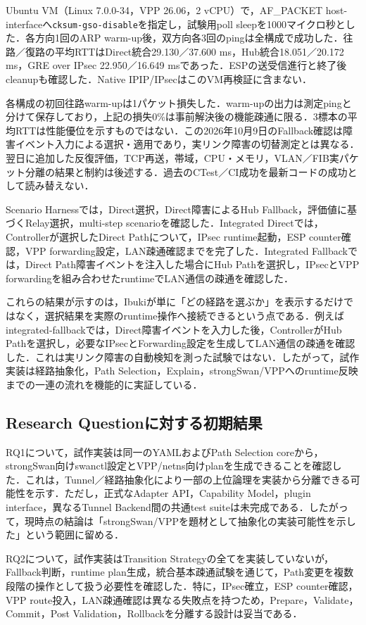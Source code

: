 \documentclass[11pt,a4paper,twoside]{ltjsarticle}
\begin{document}
Ubuntu VM（Linux 7.0.0-34，VPP 26.06，2 vCPU）で，AF\_PACKET host-interfaceへ\texttt{cksum-gso-disable}を指定し，試験用poll sleepを1000マイクロ秒とした．各方向1回のARP warm-up後，双方向各3回のpingは全構成で成功した．往路／復路の平均RTTはDirect統合29.130／37.600 ms，Hub統合18.051／20.172 ms，GRE over IPsec 22.950／16.649 msであった．ESPの送受信進行と終了後cleanupも確認した．Native IPIP/IPsecはこのVM再検証に含まない．

各構成の初回往路warm-upは1パケット損失した．warm-upの出力は測定pingと分けて保存しており，上記の損失0\%は事前解決後の機能疎通に限る．3標本の平均RTTは性能優位を示すものではない．この2026年10月9日のFallback確認は障害イベント入力による選択・適用であり，実リンク障害の切替測定とは異なる．翌日に追加した反復評価，TCP再送，帯域，CPU・メモリ，VLAN／FIB実パケット分離の結果と制約は後述する．過去のCTest／CI成功を最新コードの成功として読み替えない．

Scenario Harnessでは，Direct選択，Direct障害によるHub Fallback，評価値に基づくRelay選択，multi-step scenarioを確認した．Integrated Directでは，Controllerが選択したDirect Pathについて，IPsec runtime起動，ESP counter確認，VPP forwarding設定，LAN疎通確認までを完了した．Integrated Fallbackでは，Direct Path障害イベントを注入した場合にHub Pathを選択し，IPsecとVPP forwardingを組み合わせたruntimeでLAN通信の疎通を確認した．

これらの結果が示すのは，Ibukiが単に「どの経路を選ぶか」を表示するだけではなく，選択結果を実際のruntime操作へ接続できるという点である．例えばintegrated-fallbackでは，Direct障害イベントを入力した後，ControllerがHub Pathを選択し，必要なIPsecとForwarding設定を生成してLAN通信の疎通を確認した．これは実リンク障害の自動検知を測った試験ではない．したがって，試作実装は経路抽象化，Path Selection，Explain，strongSwan/VPPへのruntime反映までの一連の流れを機能的に実証している．

\subsection{Research Questionに対する初期結果}
RQ1について，試作実装は同一のYAMLおよびPath Selection coreから，strongSwan向けswanctl設定とVPP/netns向けplanを生成できることを確認した．これは，Tunnel／経路抽象化により一部の上位論理を実装から分離できる可能性を示す．ただし，正式なAdapter API，Capability Model，plugin interface，異なるTunnel Backend間の共通test suiteは未完成である．したがって，現時点の結論は「strongSwan/VPPを題材として抽象化の実装可能性を示した」という範囲に留める．

RQ2について，試作実装はTransition Strategyの全てを実装していないが，Fallback判断，runtime plan生成，統合基本疎通試験を通じて，Path変更を複数段階の操作として扱う必要性を確認した．特に，IPsec確立，ESP counter確認，VPP route投入，LAN疎通確認は異なる失敗点を持つため，Prepare，Validate，Commit，Post Validation，Rollbackを分離する設計は妥当である．
\end{document}
